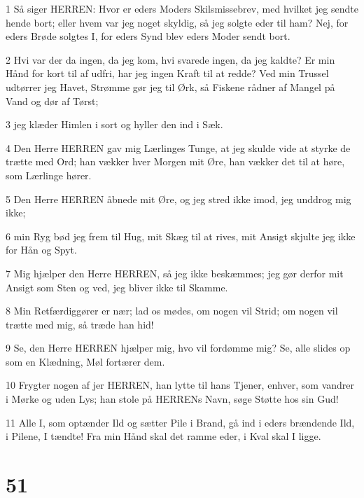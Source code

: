 \par 1 Så siger HERREN: Hvor er eders Moders Skilsmissebrev, med hvilket jeg sendte hende bort; eller hvem var jeg noget skyldig, så jeg solgte eder til ham? Nej, for eders Brøde solgtes I, for eders Synd blev eders Moder sendt bort.
\par 2 Hvi var der da ingen, da jeg kom, hvi svarede ingen, da jeg kaldte? Er min Hånd for kort til af udfri, har jeg ingen Kraft til at redde? Ved min Trussel udtørrer jeg Havet, Strømme gør jeg til Ørk, så Fiskene rådner af Mangel på Vand og dør af Tørst;
\par 3 jeg klæder Himlen i sort og hyller den ind i Sæk.
\par 4 Den Herre HERREN gav mig Lærlinges Tunge, at jeg skulde vide at styrke de trætte med Ord; han vækker hver Morgen mit Øre, han vækker det til at høre, som Lærlinge hører.
\par 5 Den Herre HERREN åbnede mit Øre, og jeg stred ikke imod, jeg unddrog mig ikke;
\par 6 min Ryg bød jeg frem til Hug, mit Skæg til at rives, mit Ansigt skjulte jeg ikke for Hån og Spyt.
\par 7 Mig hjælper den Herre HERREN, så jeg ikke beskæmmes; jeg gør derfor mit Ansigt som Sten og ved, jeg bliver ikke til Skamme.
\par 8 Min Retfærdiggører er nær; lad os mødes, om nogen vil Strid; om nogen vil trætte med mig, så træde han hid!
\par 9 Se, den Herre HERREN hjælper mig, hvo vil fordømme mig? Se, alle slides op som en Klædning, Møl fortærer dem.
\par 10 Frygter nogen af jer HERREN, han lytte til hans Tjener, enhver, som vandrer i Mørke og uden Lys; han stole på HERRENs Navn, søge Støtte hos sin Gud!
\par 11 Alle I, som optænder Ild og sætter Pile i Brand, gå ind i eders brændende Ild, i Pilene, I tændte! Fra min Hånd skal det ramme eder, i Kval skal I ligge.

\chapter{51}

